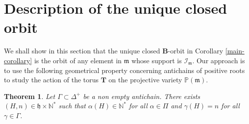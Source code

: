 \documentclass[10pt,a4paper]{amsart}
\newcommand{\soc}[1]{\mathcal{I}_{#1}}
\newcommand{\group}[1]{\mathbf{#1}}
\numberwithin{equation}{section}
\theoremstyle{plain}
\newtheorem{theorem}{Theorem}[section]
\theoremstyle{definition}
\theoremstyle{remark}
\begin{document}
\section{Description of the unique closed orbit}\label{sec:description}

We shall show in this section that the unique closed $\group{B}$-orbit in Corollary \ref{main-corollary}
is the orbit of any element in $\mathfrak{m}$
whose support is $\soc{\mathfrak{m}}$. Our approach is to use the
following geometrical property concerning antichains of positive roots to study 
the action of the torus $\group{T}$ on the projective variety $\mathbb{P}(\mathfrak{m})$.

\begin{theorem}\label{antichain-hyperplane}
Let $\Gamma \subset \Delta^{+}$ be a non empty antichain. 
There exists $(H,n) \in \mathfrak{h}\times \mathbb{N}^{*}$ such that 
$\alpha (H) \in \mathbb{N}^{*}$ for all $\alpha \in \Pi$ and 
$\gamma  (H) = n$ 
for all $\gamma \in \Gamma$.
\end{theorem}
\end{document}
